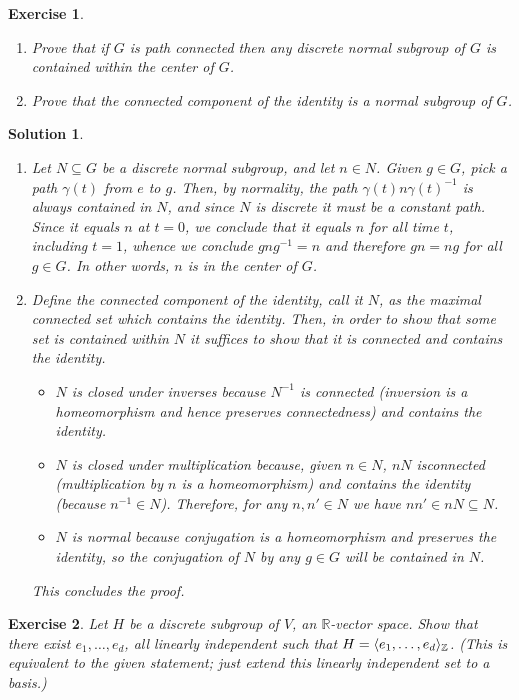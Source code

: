 \documentclass{article}
\newtheorem{ex}{Exercise}
\theoremstyle{nonumberplain}
\newtheorem{sol}{Solution}
\newcommand{\R}{\mathbb{R}}
\newcommand{\Z}{\mathbb{Z}}
\DeclarePairedDelimiter{\braket}{\langle}{\rangle}
\begin{document}
\begin{ex}\leavevmode
\begin{enumerate}
\item Prove that if $G$ is path connected then any discrete normal subgroup of $G$ is contained within the center of $G$.
\item Prove that the connected component of the identity is a normal subgroup of $G$.
\end{enumerate}
\end{ex}

\begin{sol}\leavevmode
\begin{enumerate}
\item Let $N \subseteq G$ be a discrete normal subgroup, and let $n \in N$.  Given $g \in G$, pick a path $\gamma(t)$ from $e$ to $g$. Then, by normality, the path $\gamma(t) n \gamma(t)^{-1}$ is always contained in $N$, and since $N$ is discrete it must be a constant path. Since it equals $n$ at $t = 0$, we conclude that it equals $n$ for all time $t$, including $t = 1$, whence we conclude $g n g^{-1} = n$ and therefore $gn = ng$ for all $g \in G$. In other words, $n$ is in the center of $G$.
\item Define the connected component of the identity, call it $N$, as the maximal connected set which contains the identity. Then, in order to show that some set is contained within $N$ it suffices to show that it is connected and contains the identity.
\begin{itemize}
\item $N$ is closed under inverses because $N^{-1}$ is connected (inversion is a homeomorphism and hence preserves connectedness) and contains the identity.
\item $N$ is closed under multiplication because, given $n \in N$, $nN$ isconnected (multiplication by $n$ is a homeomorphism) and contains the identity (because $n^{-1} \in N$). Therefore, for any $n, n' \in N$ we have $nn' \in nN \subseteq N$.
\item $N$ is normal because conjugation is a homeomorphism and preserves the identity, so the conjugation of $N$ by any $g \in G$ will be contained in $N$.
\end{itemize}

This concludes the proof.
\end{enumerate}
\end{sol}

\begin{ex}
Let $H$ be a discrete subgroup of $V$, an $\R$-vector space. Show that there exist $e_1, \dots, e_d$, all linearly independent such that $H = \braket{e_1, \dots, e_d}_\Z$. (This is equivalent to the given statement; just extend this linearly independent set to a basis.)
\end{ex}
\end{document}
